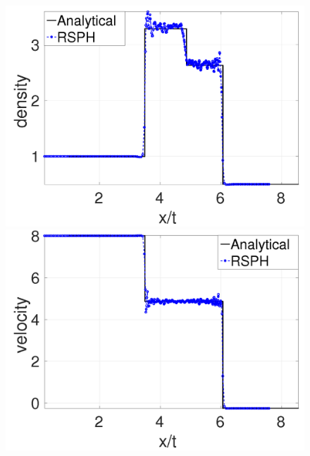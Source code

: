 \documentclass[review]{elsarticle}
\begin{document}
\begin{figure}[H]
    \begin{minipage}{.415\textwidth}
        \centering
        \includegraphics[width=0.99 \textwidth]{./Figures/Dshock-RCM-rho-Rp6}
    \end{minipage}%
    \begin{minipage}{.415 \textwidth}
        \centering
        \includegraphics[width=0.99 \textwidth]{./Figures/Dshock-RCM-v-Rp6}
    \end{minipage}%
    \\
    \begin{minipage}{.415\textwidth}
        \centering

\end{minipage}
\end{figure}
\end{document}
